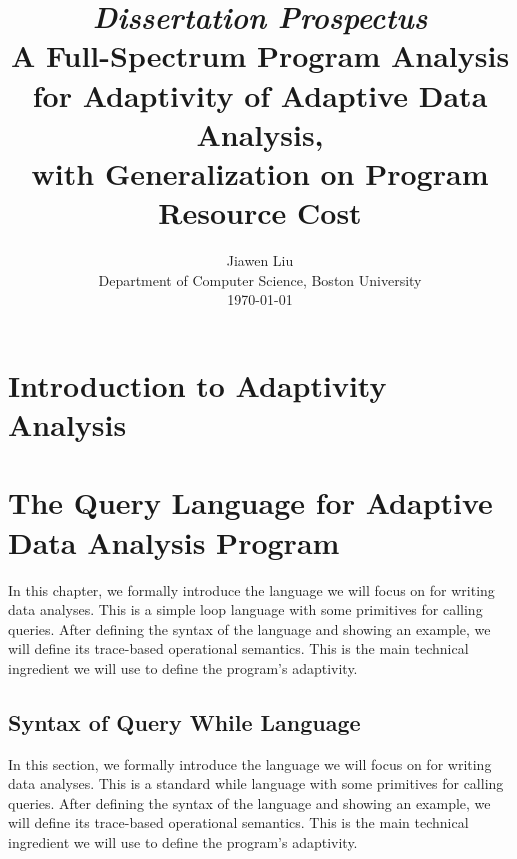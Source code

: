 \documentclass[a4paper,11pt]{article}
\begin{document}
\title{{\em Dissertation Prospectus}
\\  A Full-Spectrum Program Analysis for Adaptivity of Adaptive Data Analysis, 
\\ with Generalization on Program Resource Cost}

\author{Jiawen Liu\\ Department of Computer Science, Boston University \\ \today}
\maketitle
\begin{abstract}

  
\end{abstract}
\tableofcontents{}

\section{Introduction to Adaptivity Analysis}
\label{sec:introduction}
% 
\cleardoublepage



\section{The Query Language for Adaptive Data Analysis Program}
\label{sec:language}
In this chapter, we formally introduce the language we will focus on for writing data analyses.  
This is a simple loop language with some primitives for calling queries. 
After defining the syntax of the language and showing an example, we will define its trace-based operational semantics. 
This is the main technical ingredient we will use to define the program's adaptivity.

\subsection{Syntax of Query While Language}
\label{sec:language-syntax}
In this section, we formally introduce the language we will focus on for writing data analyses.  This is a standard while language with some primitives for calling queries. After defining the syntax of the language and showing an example, we will define its trace-based operational semantics. This is the main technical ingredient we will use to define the program's adaptivity.
\end{document}
